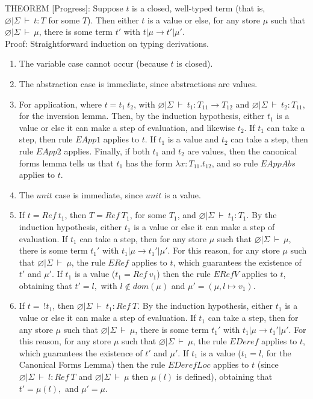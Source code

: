 \documentclass [proof]{article}
\newcommand{\tto}{\longrightarrow}
\newcommand{\envE}{{\varnothing | \Sigma \ \vdash}}
\begin{document}
THEOREM [Progress]: Suppose $t$ is a closed, well-typed term (that is, $ \envE \ t : T$ for some $T$). Then either $t$ is a value or else, for any store $\mu$ such that $\envE \ \mu$, there is some term $t'$ with $t|\mu \tto t'|\mu'$.\\
Proof: Straightforward induction on typing derivations.
\begin{enumerate}
\item The variable case cannot occur (because $t$ is closed).
\item The abstraction case is immediate, since abstractions are values.
\item For application, where $t = t_1 \ t_2$, with $\envE \ t_1 : T_{11} \tto T_{12}$ and $\envE \ t_2 : T_{11}$, for the inversion lemma. Then, by the induction hypothesis, either $t_1$ is a value or else it can make a step of evaluation, and likewise $t_2$. If $t_1$ can take a step, then rule $EApp1$ applies to $t$. If $t_1$ is a value and $t_2$ can take a step, then rule $EApp2$ applies. Finally, if both $t_1$ and $t_2$ are values, then the canonical forms lemma tells us that $t_1$ has the form $\lambda x: T_{11}.t_{12}$, and so rule $EAppAbs$ applies to $t$.
\item The $unit$ case is immediate, since $unit$ is a value.
\item If $t = Ref \ t_1$, then $T = Ref \ T_1$, for some $T_1$, and $\envE \ t_1 : T_1$. By the induction hypothesis, either $t_1$ is a value or else it can make a step of evaluation. If $t_1$ can take a step, then for any store $\mu$ such that $\envE \ \mu$, there is some term $t_1'$ with $t_1|\mu \tto t_1'|\mu'$. For this reason, for any store $\mu$ such that $\envE \ \mu$, the rule $ERef$ applies to $t$, which guarantees the existence of $t'$ and $\mu'$. If $t_1$ is a value ($t_1 = Ref \ v_1$) then the rule $ERefV$ applies to $t$, obtaining that $t' = l,$ with $l \not\in dom(\mu)$ and $\mu' = (\mu, l \mapsto v_1)$.
\item If $t = \ !t_1$, then $\envE \ t_1 : Ref \ T$. By the induction hypothesis, either $t_1$ is a value or else it can make a step of evaluation. If $t_1$ can take a step, then for any store $\mu$ such that $\envE \ \mu$, there is some term $t_1'$ with $t_1|\mu \tto t_1'|\mu'$. For this reason, for any store $\mu$ such that $\envE \ \mu$, the rule $EDeref$ applies to $t$, which guarantees the existence of $t'$ and $\mu'$. If $t_1$ is a value ($t_1 = l$, for the Canonical Forms Lemma) then the rule $EDerefLoc$ applies to $t$ (since $\envE \ l : Ref \ T$ and $\envE \ \mu$ then $\mu(l)$ is defined), obtaining that $t' = \mu(l),$ and $\mu' = \mu$.

\end{enumerate}
\end{document}
